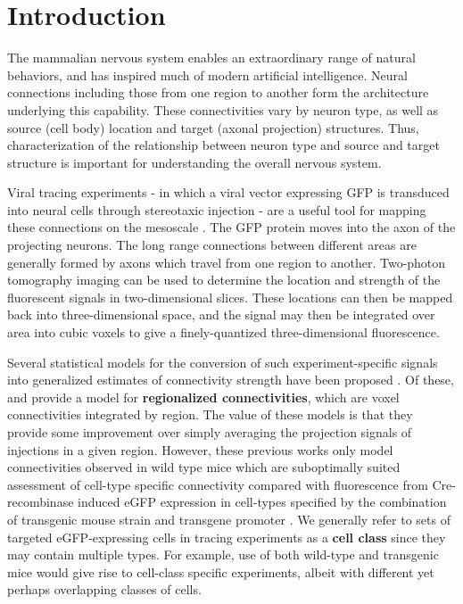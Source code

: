 \section{Introduction}
 
The mammalian nervous system enables an extraordinary range of natural behaviors, and has inspired much of modern artificial intelligence.
Neural connections including those from one region to another form the architecture underlying this capability.
These connectivities vary by neuron type, as well as source (cell body) location and target (axonal projection) structures.
Thus, characterization of the relationship between neuron type and source and target structure is important for understanding the overall nervous system.

Viral tracing experiments - in which a viral vector expressing GFP is transduced into neural cells through stereotaxic injection - are a useful tool for mapping these connections on the mesoscale \citep{Chamberlin1998-hi,Harris2012-fw, Daigle2018-gd}.
The GFP protein moves into the axon of the projecting neurons. The long range connections between different areas are generally formed by axons which travel from one region to another. 
Two-photon tomography imaging can be used to determine the location and strength of the fluorescent signals in two-dimensional slices.
These locations can then be mapped back into three-dimensional space, and the signal may then be integrated over area into cubic voxels to give a finely-quantized three-dimensional fluorescence.

Several statistical models for the conversion of such experiment-specific signals into generalized estimates of connectivity strength have been proposed \citep{Oh2014-kh, Harris2016-fn, Gamanut2018-sd, Knox2019-ot}.
Of these, \citet{Oh2014-kh} and \citet{Knox2019-ot} provide a model for \textbf{regionalized connectivities}, which are voxel connectivities integrated by region.
The value of these models is that they provide some improvement over simply averaging the projection signals of injections in a given region.
However, these previous works only model connectivities observed in wild type mice which are suboptimally suited assessment of cell-type specific connectivity compared with fluorescence from Cre-recombinase induced eGFP expression in cell-types specified by the combination of transgenic mouse strain and transgene promoter \citep{Harris2019-mr}.
We generally refer to sets of targeted eGFP-expressing cells in tracing experiments as a \textbf{cell class} since they may contain multiple types.
For example, use of both wild-type and transgenic mice would give rise to cell-class specific experiments, albeit with different yet perhaps overlapping classes of cells.

